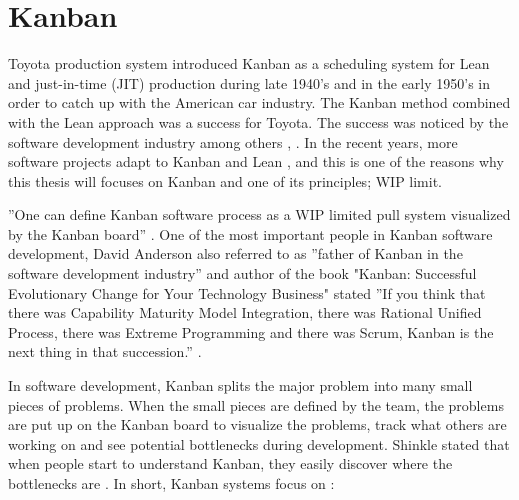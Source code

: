 \documentclass[UKenglish]{ifimaster}  %
\begin{document}
\section{Kanban}
\label{sec:Kan}

Toyota production system introduced Kanban as a scheduling system for Lean and just-in-time (JIT) production during late 1940's and in the early 1950's in order to catch up with the American car industry. The Kanban method combined with the Lean approach was a success for Toyota. The success was noticed by the software development industry among others \parencite{Conboy}, \parencite{ono1988toyota}. In the recent years, more software projects adapt to Kanban and Lean \parencite{DavidAnderson}, and this is one of the reasons why this thesis will focuses on Kanban and one of its principles; WIP limit. 

''One can define Kanban software process as a WIP limited pull system visualized by the Kanban board''  \parencite{DavidAnderson}.
One of the most important people in Kanban software development, David Anderson  also referred to as ''father of Kanban in the software development industry''  \parencite{InfoQ:2013:May:Online} and author of the book "Kanban: Successful Evolutionary Change for Your Technology Business" stated ''If you think that there was Capability Maturity Model Integration, there was Rational Unified Process, there was Extreme Programming and there was Scrum, Kanban is the next thing in that succession.''   \parencite{InfoQ} .

In software development, Kanban splits the major problem into many small pieces of problems. When the small pieces are defined by the team, the problems are put up on the Kanban board to visualize the problems, track what others are working on and see potential bottlenecks during development. Shinkle stated that when people start to understand Kanban, they easily discover where the bottlenecks are \parencite{Shinkle}. In short, Kanban systems focus on \parencite{DavidAnderson}:
\end{document}
